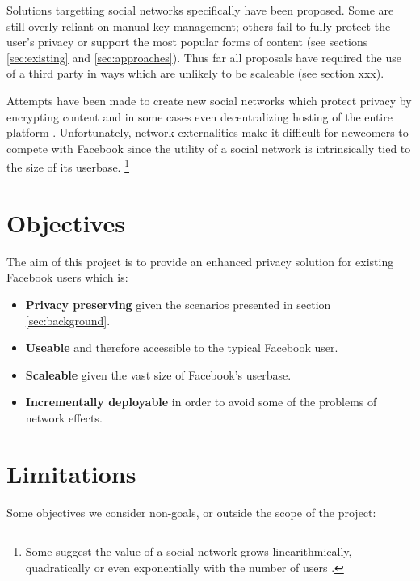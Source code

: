 Solutions targetting social networks specifically have been proposed. Some are still overly reliant on manual key management; others fail to fully protect the user's privacy or support the most popular forms of content (see sections \ref{sec:existing} and \ref{sec:approaches}). Thus far all proposals have required the use of a third party in ways which are unlikely to be scaleable (see section xxx). 
  
Attempts have been made to create new social networks which protect privacy by encrypting content and in some cases even decentralizing hosting of the entire platform \cite{pidder} \cite{diaspora}. Unfortunately, network externalities make it difficult for newcomers to compete with Facebook since the utility of a social network is intrinsically tied to the size of its userbase. \footnote{Some suggest the value of a social network grows linearithmically, quadratically or even exponentially with the number of users \cite{fb-network} \cite{metcalf}.}


\section{Objectives}
\label{sec:objectives}

The aim of this project is to provide an enhanced privacy solution for existing Facebook users which is:

\begin{itemize}

    \item \textbf{Privacy preserving} given the scenarios presented in section \ref{sec:background}.

    \item \textbf{Useable} and therefore accessible to the typical Facebook user.

    \item \textbf{Scaleable} given the vast size of Facebook's userbase. 
    
    \item \textbf{Incrementally deployable} in order to avoid some of the problems of network effects.

\end{itemize}


\section{Limitations}
\label{sec:limit}

Some objectives we consider non-goals, or outside the scope of the project:

